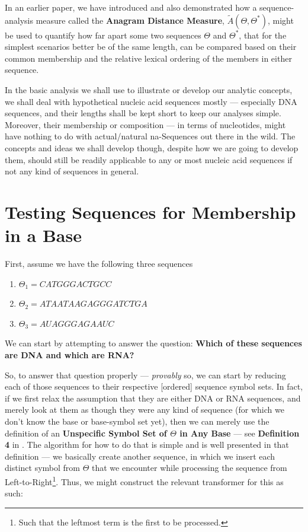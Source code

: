 \documentclass[a4paper, 18pt]{book} %
\begin{document}
In an earlier paper\cite{adtpaper}, we have introduced and also demonstrated how a sequence-analysis measure called the \textbf{Anagram Distance Measure}, $\tilde{A}(\Theta,\Theta^*)$, might be used to quantify how far apart some two sequences $\Theta$ and $\Theta^*$, that for the simplest scenarios better be of the same length, can be compared based on their common membership and the relative lexical ordering of the members in either sequence.

In the basic analysis we shall use to illustrate or develop our analytic concepts, we shall deal with hypothetical nucleic acid sequences mostly --- especially DNA sequences, and their lengths shall be kept short to keep our analyses simple. Moreover, their membership or composition --- in terms of nucleotides, might have nothing to do with actual/natural na-Sequences out there in the wild. The concepts and ideas we shall develop though, despite how we are going to develop them, should still be readily applicable to any or most nucleic acid sequences if not any kind of sequences in general.


\section{Testing Sequences for Membership in a Base}

First, assume we have the following three sequences

\begin{enumerate}
\item $\Theta_1 = CATGGGACTGCC$
\item $\Theta_2 = ATAATAAGAGGGATCTGA$
\item $\Theta_3 = AUAGGGAGAAUC$
\end{enumerate}

We can start by attempting to answer the question: \textbf{Which of these sequences are DNA and which are RNA?}

So, to answer that question properly --- \textit{provably} so, we can start by reducing each of those sequences to their respective [ordered] sequence symbol sets. In fact, if we first relax the assumption that they are either DNA or RNA sequences, and merely look at them as though they were any kind of sequence (for which we don't know the base or base-symbol set yet), then we can merely use the definition of an \textbf{Unspecific Symbol Set of $\Theta$ in Any Base} --- see \textbf{Definition 4} in \cite{ossipaper}. The algorithm for how to do that is simple and is well presented in that definition --- we basically create another sequence, in which we insert each distinct symbol from $\Theta$ that we encounter while processing the sequence from Left-to-Right\footnote{Such that the leftmost term is the first to be processed.}. Thus, we might construct the relevant transformer for this as such:
\end{document}
